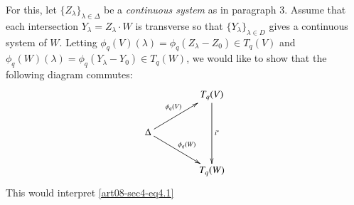 For this, let $\{Z_{\lambda}\}_{\lambda\in \Delta}$ be a {\em continuous system} as in paragraph 3. Assume that each intersection $Y_{\lambda}=Z_{\lambda}\cdot W$ is transverse so that $\{Y_{\lambda}\}_{\lambda\in D}$ gives a continuous system of $W$. Letting $\phi_{q}(V)(\lambda)=\phi_{q}(Z_{\lambda}-Z_{0})\in T_{q}(V)$ and $\phi_{q}(W)(\lambda)=\phi_{q}(Y_{\lambda}-Y_{0})\in T_{q}(W)$, we would like to show that the following diagram commutes:
\begin{equation}
\vcenter{\xymatrix@C=1.5cm{
 & T_{q}(V)\ar[dd]^{i^{*}}\\
\Delta\ar[ur]^{\phi_{q}(V)}\ar[dr]^{\phi_{q}(W)} & \\
 & T_{q}(W)
}}\label{art08-sec4-eq4.2}
\end{equation}
This would interpret \eqref{art08-sec4-eq4.1}

